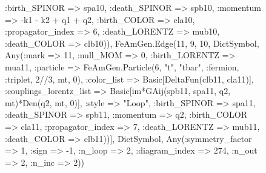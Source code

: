 \documentclass{revtex4}
\begin{document}
\begin{figure}[!htb]
\begin{center}
{:birth_SPINOR => spa10, :death_SPINOR => spb10, :momentum => -k1 - k2 + q1 + q2, :birth_COLOR => cla10, :propagator_index => 6, :death_LORENTZ => mub10, :death_COLOR => clb10)), FeAmGen.Edge(11, 9, 10, Dict{Symbol, Any}(:mark => 11, :null_MOM => 0, :birth_LORENTZ => mua11, :particle => FeAmGen.Particle(6, "t", "tbar", :fermion, :triplet, 2//3, mt, 0), :color_list => Basic[DeltaFun(clb11, cla11)], :couplings_lorentz_list => Basic[im*GAij(spb11, spa11, q2, mt)*Den(q2, mt, 0)], :style => "Loop", :birth_SPINOR => spa11, :death_SPINOR => spb11, :momentum => q2, :birth_COLOR => cla11, :propagator_index => 7, :death_LORENTZ => mub11, :death_COLOR => clb11))], Dict{Symbol, Any}(:symmetry_factor => 1, :sign => -1, :n_loop => 2, :diagram_index => 274, :n_out => 2, :n_inc => 2)) 
}
\end{center}
\end{figure}
\end{document}
